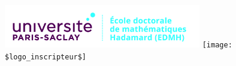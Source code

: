 \documentclass[12pt,twoside]{reedthesis}
\begin{document}
\thispagestyle{empty}
\vspace{-2cm}

\voffset-10pt


\noindent
\hspace*{-1cm}\hbox{\includegraphics[width=8.6cm]{logos/ed_edmh-h.jpg}}
\hfill
{}
\hfill
\hbox{\texttt{[image: \$logo\_inscripteur\$]}}
\vspace{7mm}
\end{document}
